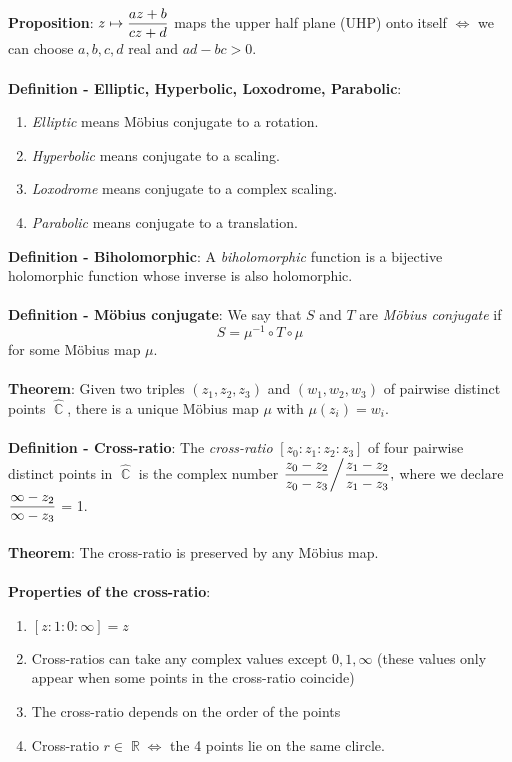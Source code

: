 \documentclass{article}
\DeclareMathOperator{\R}{\mathbb{R}}
\DeclareMathOperator{\C}{\mathbb{C}}
\begin{document}
\textbf{Proposition}: $z \mapsto \mathlarger{\frac{az + b}{cz + d}}$ maps the upper half plane (UHP) onto itself $\iff$ we can choose $a, b, c, d$ real and $ad - bc > 0$. \\ \\
\textbf{Definition - Elliptic, Hyperbolic, Loxodrome, Parabolic}: \begin{enumerate}
    \item \textit{Elliptic} means Möbius conjugate to a rotation.
    \item \textit{Hyperbolic} means conjugate to a scaling.
    \item \textit{Loxodrome} means conjugate to a complex scaling.
    \item \textit{Parabolic} means conjugate to a translation.
\end{enumerate} $ $ \\
\textbf{Definition - Biholomorphic}: A \textit{biholomorphic} function is a bijective holomorphic function whose inverse is also holomorphic. \\ \\
\textbf{Definition - Möbius conjugate}: We say that $S$ and $T$ are \textit{Möbius conjugate} if $$S = \mu^{-1} \circ T \circ \mu$$ for some Möbius map $\mu$. \\ \\
\textbf{Theorem}: Given two triples $(z_1, z_2, z_3)$ and $(w_1, w_2, w_3)$ of pairwise distinct points $\hat{\C}$, there is a unique Möbius map $\mu$ with $\mu(z_i) = w_i$. \\ \\
\textbf{Definition - Cross-ratio}: The \textit{cross-ratio} $[z_0: z_1: z_2: z_3]$ of four pairwise distinct points in $\hat{\C}$ is the complex number $\mathlarger{\frac{z_0 - z_2}{z_0 - z_3} \bigg/ \frac{z_1 - z_2}{z_1 - z_3}},$ where we declare $\mathlarger{\frac{\infty - z_2}{\infty - z_3}}$ = 1. \\ \\
\textbf{Theorem}: The cross-ratio is preserved by any Möbius map. \\ \\
\textbf{Properties of the cross-ratio}: \begin{enumerate}
    \item $[z: 1: 0: \infty] = z$
    \item Cross-ratios can take any complex values except $0, 1, \infty$ (these values only appear when some points in the cross-ratio coincide)
    \item The cross-ratio depends on the order of the points
    \item Cross-ratio $r \in \R \iff$ the 4 points lie on the same clircle.
\end{enumerate} $ $ \\
\end{document}
